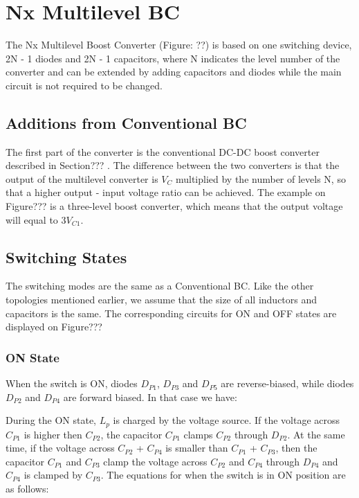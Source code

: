 \section{Nx Multilevel BC}\label{ch:NXMLBC}


The Nx Multilevel Boost Converter (Figure: ??) is based on one switching device, 2N - 1 diodes and 2N - 1 capacitors, where N indicates the level number of the converter and can be extended by adding capacitors and diodes while the main circuit is not required to be changed. 

\subsection{Additions from Conventional BC}
The first part of the converter is the conventional DC-DC boost converter described in Section??? . The difference between the two converters is that the output of the multilevel converter is $V_C$ multiplied by the number of levels N, so that a higher output - input voltage ratio can be achieved. The example on Figure??? is a three-level boost converter, which means that the output voltage will equal to $3V_{C1}$. 

\subsection{Switching States}
The switching modes are the same as a Conventional BC. Like the other topologies mentioned earlier, we assume that the size of all inductors and capacitors is the same. The corresponding circuits for ON and OFF states are displayed on Figure???

\subsubsection{ON State}
When the switch is ON, diodes $D_{P1}$, $D_{P3}$ and $D_{P5}$ are reverse-biased, while diodes $D_{P2}$ and $D_{P4}$ are forward biased. In that case we have:

During the ON state, $L_p$ is charged by the voltage source. If the voltage across $C_{P1}$ is higher then $C_{P2}$, the capacitor $C_{P1}$ clamps $C_{P2}$ through $D_{P2}$. At the same time, if the voltage across $C_{P2}$ + $C_{P4}$ is smaller than $C_{P1}$ + $C_{P3}$, then the capacitor $C_{P1}$ and $C_{P3}$ clamp the voltage across $C_{P2}$ and $C_{P4}$ through $D_{P4}$ and $C_{P4}$ is clamped by $C_{P3}$. The equations for when the switch is in ON position are as follows:


